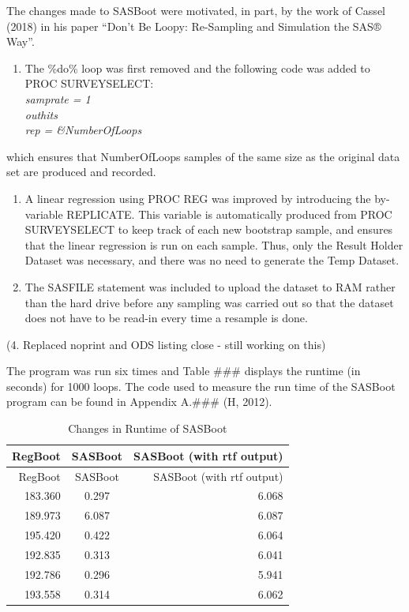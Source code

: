 \documentclass[]{article}
\providecommand{\tightlist}{%
  \setlength{\itemsep}{0pt}\setlength{\parskip}{0pt}}
\begin{document}
The changes made to SASBoot were motivated, in part, by the work of
Cassel (2018) in his paper ``Don't Be Loopy: Re-Sampling and Simulation
the SAS® Way''.

\begin{enumerate}
\def\labelenumi{\arabic{enumi}.}
\tightlist
\item
  The \%do\% loop was first removed and the following code was added to
  PROC SURVEYSELECT:\\
  \emph{samprate = 1}\\
  \emph{outhits}\\
  \emph{rep = \&NumberOfLoops}
\end{enumerate}

which ensures that NumberOfLoops samples of the same size as the
original data set are produced and recorded.

\begin{enumerate}
\def\labelenumi{\arabic{enumi}.}
\setcounter{enumi}{1}
\item
  A linear regression using PROC REG was improved by introducing the
  by-variable REPLICATE. This variable is automatically produced from
  PROC SURVEYSELECT to keep track of each new bootstrap sample, and
  ensures that the linear regression is run on each sample. Thus, only
  the Result Holder Dataset was necessary, and there was no need to
  generate the Temp Dataset.
\item
  The SASFILE statement was included to upload the dataset to RAM rather
  than the hard drive before any sampling was carried out so that the
  dataset does not have to be read-in every time a resample is done.
\end{enumerate}

(4. Replaced noprint and ODS listing close - still working on this)

The program was run six times and Table \#\#\# displays the runtime (in
seconds) for 1000 loops. The code used to measure the run time of the
SASBoot program can be found in Appendix A.\#\#\# (H, 2012).

\begin{longtable}[]{@{}rcr@{}}
\caption{Changes in Runtime of SASBoot}\tabularnewline
\toprule
RegBoot & SASBoot & SASBoot (with rtf output)\tabularnewline
\midrule
\endfirsthead
\toprule
RegBoot & SASBoot & SASBoot (with rtf output)\tabularnewline
\midrule
\endhead
183.360 & 0.297 & 6.068\tabularnewline
189.973 & 6.087 & 6.087\tabularnewline
195.420 & 0.422 & 6.064\tabularnewline
192.835 & 0.313 & 6.041\tabularnewline
192.786 & 0.296 & 5.941\tabularnewline
193.558 & 0.314 & 6.062\tabularnewline
\bottomrule
\end{longtable}
\end{document}
